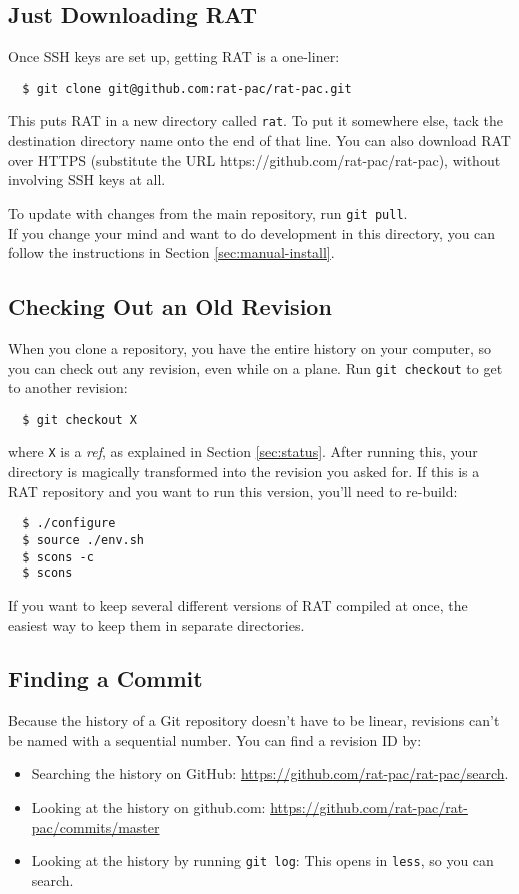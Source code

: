 \documentclass{article}
\begin{document}
\subsection{Just Downloading RAT}
\label{sec:install}
Once SSH keys are set up, getting RAT is a one-liner:
\begin{verbatim}
  $ git clone git@github.com:rat-pac/rat-pac.git
\end{verbatim}
This puts RAT in a new directory called {\tt rat}. To put it somewhere else,
tack the destination directory name onto the end of that line. You can also
download RAT over HTTPS (substitute the URL
https://github.com/rat-pac/rat-pac), without
involving SSH keys at all.

To update with changes from the main repository, run {\tt git pull}.\\

If you change your mind and want to do development in this directory, you can
follow the instructions in Section \ref{sec:manual-install}.

\subsection{Checking Out an Old Revision}
When you clone a repository, you have the entire history on your computer,
so you can check out any revision, even while on a plane. Run
{\tt git checkout} to get to another revision:

\begin{verbatim}
  $ git checkout X
\end{verbatim}
where {\tt X} is a {\it ref}, as explained in Section \ref{sec:status}.
After running this, your directory is magically transformed into the revision
you asked for. If this is a RAT repository and you want to run this version,
you'll need to re-build:

\begin{verbatim}
  $ ./configure
  $ source ./env.sh
  $ scons -c
  $ scons
\end{verbatim}
If you want to keep several different versions of RAT compiled at once, the
easiest way to keep them in separate directories.

\subsection{Finding a Commit}
Because the history of a Git repository doesn't have to be linear, revisions
can't be named with a sequential number. You can find a revision ID by:
\begin{itemize}
\item Searching the history on GitHub:
\href{https://github.com/rat-pac/rat-pac/search}{https://github.com/rat-pac/rat-pac/search}.
\item Looking at the history on github.com: \href{https://github.com/rat-pac/rat-pac/commits/master}{https://github.com/rat-pac/rat-pac/commits/master}
\item Looking at the history by running {\tt git log}: This opens in {\tt less}, so you can search.
\end{itemize}
\end{document}
